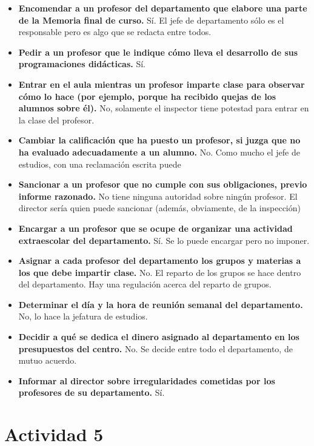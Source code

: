 \begin{itemize}

	\item \textbf{Encomendar a un profesor del departamento que elabore una parte de la Memoria final de curso.}
	Sí. El jefe de departamento sólo es el responsable pero es algo que se redacta entre todos.
	\item \textbf{Pedir a un profesor que le indique cómo lleva el desarrollo de sus programaciones didácticas.}
	Sí.
	\item \textbf{Entrar en el aula mientras un profesor imparte clase para observar cómo lo hace (por ejemplo, porque ha recibido quejas de los alumnos sobre él).}
	No, solamente el inspector tiene potestad para entrar en la clase del profesor.
	\item \textbf{Cambiar la calificación que ha puesto un profesor, si juzga que no ha evaluado adecuadamente a un alumno.}
	No. Como mucho el jefe de estudios, con una reclamación escrita puede
	\item \textbf{Sancionar a un profesor que no cumple con sus obligaciones, previo informe razonado.}
	No tiene ninguna autoridad sobre ningún profesor. 
	El director sería quien puede sancionar (además, obviamente, de la inspección)
	\item \textbf{Encargar a un profesor que se ocupe de organizar una actividad extraescolar del departamento.}
	Sí. Se lo puede encargar pero no imponer.
	\item \textbf{Asignar a cada profesor del departamento los grupos y materias a los que debe impartir clase.}
	No. El reparto de los grupos se hace dentro del departamento. Hay una regulación acerca del reparto de grupos.
	\item \textbf{Determinar el día y la hora de reunión semanal del departamento.}
	No, lo hace la jefatura de estudios. 
	\item \textbf{Decidir a qué se dedica el dinero asignado al departamento en los presupuestos del centro.}
	No. Se decide entre todo el departamento, de mutuo acuerdo.
	\item \textbf{Informar al director sobre irregularidades cometidas por los profesores de su departamento.}
	Sí.

\end{itemize}

\section{Actividad 5}


